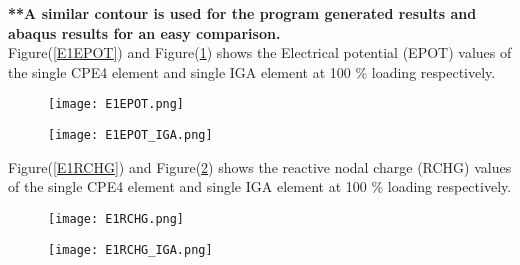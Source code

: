 \documentclass[11pt]{article}
\begin{document}
\textbf{**A similar contour is used for the program generated results and abaqus results for an easy comparison. }\\
Figure(\ref{E1EPOT}) and Figure(\ref{E1EPOT_IGA}) shows the Electrical potential (EPOT) values of the single CPE4 element and single IGA element at 100 \% loading respectively. \\
\begin{figure}[H]
	\centering
	\begin{minipage}{.5\textwidth}
		\centering
		\texttt{[image: E1EPOT.png]}
		\label{E1EPOT}
	\end{minipage}%
	\begin{minipage}{.5\textwidth}
		\centering
		\texttt{[image: E1EPOT\_IGA.png]}
		\label{E1EPOT_IGA}
	\end{minipage}
\end{figure}
\begin{comment}
\begin{figure}[H]
\begin{center}
\texttt{[image: xyz.png]} 
\caption{\\CPE4 Element U1}\label{xyz}
\end{center}	
\end{figure}

\begin{figure}[H]
\begin{center}
\texttt{[image: Figure\_1.png]} 
\caption{\\IGA Element U1}\label{Figure_1}
\end{center}	
\end{figure}
\end{comment}
Figure(\ref{E1RCHG}) and Figure(\ref{E1RCHG_IGA}) shows the reactive nodal charge (RCHG) values of the single CPE4 element and single IGA element at 100 \% loading respectively. \\
\begin{figure}[H]
	\centering
	\begin{minipage}{.5\textwidth}
		\centering
		\texttt{[image: E1RCHG.png]}
		\label{E1RCHG}
	\end{minipage}%
	\begin{minipage}{.5\textwidth}
		\centering
		\texttt{[image: E1RCHG\_IGA.png]}
		\label{E1RCHG_IGA}
	\end{minipage}
\end{figure}
\end{document}
